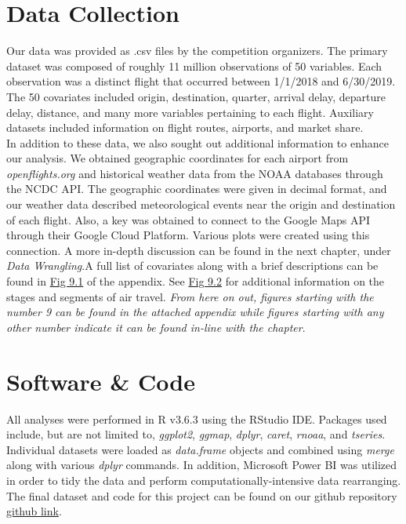 \documentclass[12pt, a4paper, openany]{book}
\newcommand\tab[1][1cm]{\hspace*{#1}}
\begin{document}
	\section{Data Collection}
	\tab Our data was provided as .csv files by the competition organizers. The primary dataset was composed of roughly 11 million observations of 50 variables. Each observation was a distinct flight that occurred between 1/1/2018 and 6/30/2019. The 50 covariates included origin, destination, quarter, arrival delay, departure delay, distance, and many more variables pertaining to each flight. Auxiliary datasets included information on flight routes, airports, and market share. \\
	\tab In addition to these data, we also sought out additional information to enhance our analysis. We obtained geographic coordinates for each airport from \textit{openflights.org} and historical weather data from the NOAA databases through the NCDC API. The geographic coordinates were given in decimal format, and our weather data described meteorological events near the origin and destination of each flight. Also, a key was obtained to connect to the Google Maps API through their Google Cloud Platform. Various plots were created using this connection. A more in-depth discussion can be found in the next chapter, under \textit{Data Wrangling}.A full list of covariates along with a brief descriptions can be found in \underline{Fig 9.1} of the appendix. See \underline{Fig 9.2} for additional information on the stages and segments of air travel. \textit{From here on out, figures starting with the number 9 can be found in the attached appendix while figures starting with any other number indicate it can be found in-line with the chapter}. 
	\section{Software \& Code}
	\tab All analyses were performed in R v3.6.3 using the RStudio IDE. Packages used include, but are not limited to, \textit{ggplot2}, \textit{ggmap}, \textit{dplyr}, \textit{caret}, \textit{rnoaa}, and \textit{tseries}. Individual datasets were loaded as \textit{data.frame} objects and combined using \textit{merge} along with various \textit{dplyr} commands. In addition, Microsoft Power BI was utilized in order to tidy the data and perform computationally-intensive data rearranging. The final dataset and code for this project can be found on our github repository \underline{github link}.

\end{document}
